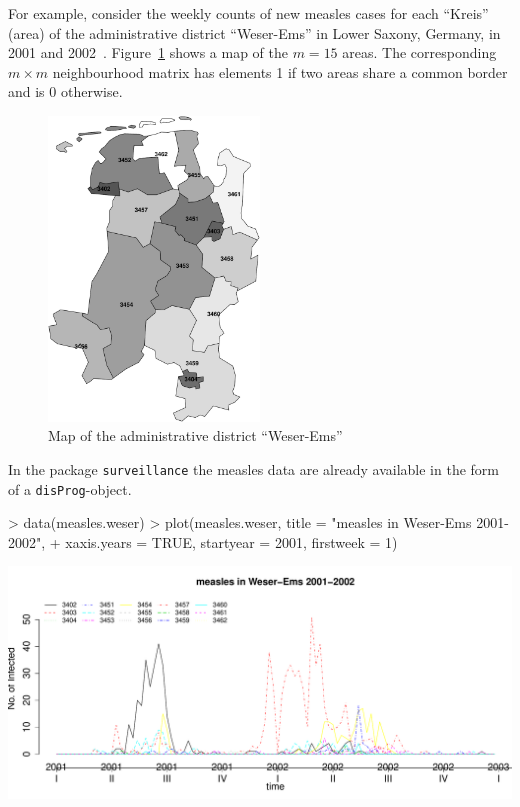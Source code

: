 \documentclass[a4paper,11pt]{article}
\begin{document}
For example, consider the weekly counts of new measles cases for each
``Kreis'' (area) of the administrative district ``Weser-Ems'' in Lower
Saxony, Germany, in 2001 and
2002~\citep{survstat}. Figure~\ref{fig:map} shows a map of the $m=15$
areas.  The corresponding $m \times m$ neighbourhood matrix has
elements 1 if two areas share a common border and is 0 otherwise.

\begin{figure}[htb]
  \centering
  \includegraphics[width=0.5\textwidth]{figs/weseremsmap2}
  \caption{Map of the administrative district ``Weser-Ems''}     
  \label{fig:map}
\end{figure}

In the package \texttt{surveillance} the measles data are already available
in the form of a \texttt{disProg}-object.

\begin{Schunk}
\begin{Sinput}
> data(measles.weser)
> plot(measles.weser, title = "measles in Weser-Ems 2001-2002", 
+     xaxis.years = TRUE, startyear = 2001, firstweek = 1)
\end{Sinput}
\end{Schunk}
\includegraphics{figs/vignette-020}
\end{document}
